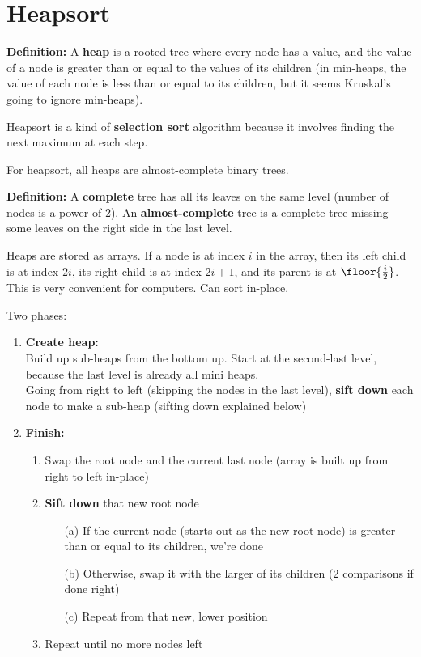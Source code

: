 \section{Heapsort}\label{sec:heapsort-lecture}

\textbf{Definition:} A \textbf{heap} is a rooted tree where every node has a value, and the value of a node is greater than or equal to the values of its children (in min-heaps, the value of each node is less than or equal to its children, but it seems Kruskal's going to ignore min-heaps).

Heapsort is a kind of \textbf{selection sort} algorithm because it involves finding the next maximum at each step.

For heapsort, all heaps are almost-complete binary trees.

\textbf{Definition:} A \textbf{complete} tree has all its leaves on the same level (number of nodes is a power of 2). An \textbf{almost-complete} tree is a complete tree missing some leaves on the right side in the last level.

Heaps are stored as arrays. If a node is at index $i$ in the array, then its left child is at index $2i$, its right child is at index $2i + 1$, and its parent is at $\floor{\frac i 2}$. This is very convenient for computers. Can sort in-place.

Two phases:
\begin{enumerate}
    \item \textbf{Create heap:}\\
    Build up sub-heaps from the bottom up. Start at the second-last level, because the last level is already all mini heaps.\\
    Going from right to left (skipping the nodes in the last level), \textbf{sift down} each node to make a sub-heap (sifting down explained below)
    \item \textbf{Finish:}
    \begin{enumerate}
        \item Swap the root node and the current last node (array is built up from right to left in-place)
        \item \textbf{Sift down} that new root node
        \begin{enumerate}
            \item[(a)] If the current node (starts out as the new root node) is greater than or equal to its children, we're done
            \item[(b)] Otherwise, swap it with the larger of its children (2 comparisons if done right)
            \item[(c)] Repeat from that new, lower position
        \end{enumerate}
        \item Repeat until no more nodes left
    \end{enumerate}
\end{enumerate}

